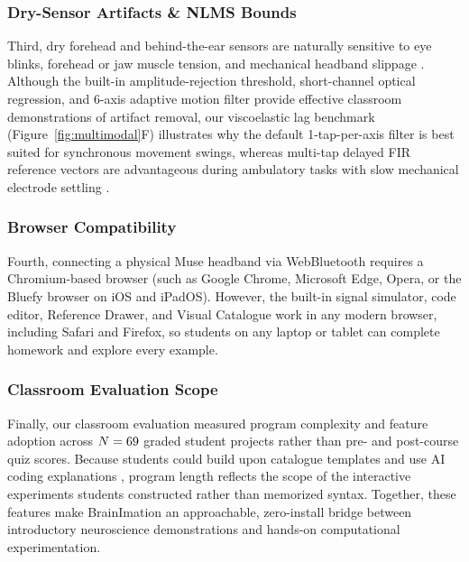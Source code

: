 \documentclass[11pt]{article}
\begin{document}
\subsubsection{Dry-Sensor Artifacts \& NLMS Bounds}
Third, dry forehead and behind-the-ear sensors are naturally sensitive to eye blinks, forehead or jaw muscle tension, and mechanical headband slippage \citep{lotte2013flaws,mathewson2017high,saager2005direct,wyser2020short}. Although the built-in amplitude-rejection threshold, short-channel optical regression, and 6-axis adaptive motion filter provide effective classroom demonstrations of artifact removal, our viscoelastic lag benchmark (Figure~\ref{fig:multimodal}F) illustrates why the default 1-tap-per-axis filter is best suited for synchronous movement swings, whereas multi-tap delayed FIR reference vectors are advantageous during ambulatory tasks with slow mechanical electrode settling \citep{rosanne2021adaptive,klug2022bemobil}.

\subsubsection{Browser Compatibility}
Fourth, connecting a physical Muse headband via WebBluetooth requires a Chromium-based browser (such as Google Chrome, Microsoft Edge, Opera, or the Bluefy browser on iOS and iPadOS). However, the built-in signal simulator, code editor, Reference Drawer, and Visual Catalogue work in any modern browser, including Safari and Firefox, so students on any laptop or tablet can complete homework and explore every example.

\subsubsection{Classroom Evaluation Scope}
Finally, our classroom evaluation measured program complexity and feature adoption across $N = 69$ graded student projects rather than pre- and post-course quiz scores. Because students could build upon catalogue templates and use AI coding explanations \citep{clindeffarges2026socrates}, program length reflects the scope of the interactive experiments students constructed rather than memorized syntax. Together, these features make BrainImation an approachable, zero-install bridge between introductory neuroscience demonstrations and hands-on computational experimentation.
\end{document}
